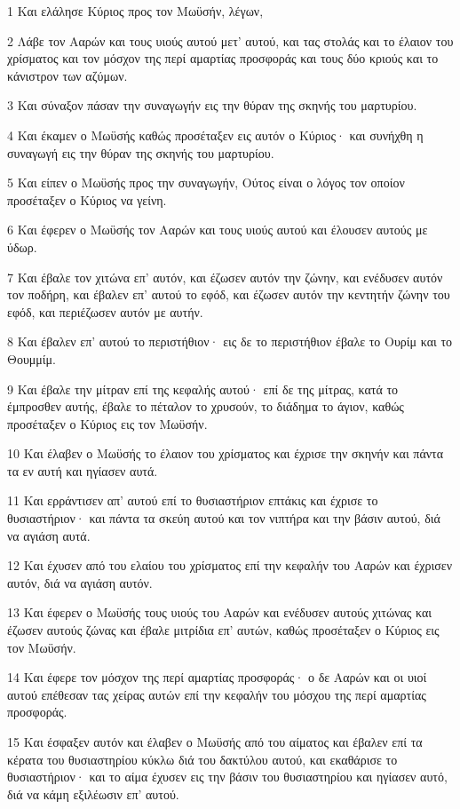 \par 1 Και ελάλησε Κύριος προς τον Μωϋσήν, λέγων,
\par 2 Λάβε τον Ααρών και τους υιούς αυτού μετ' αυτού, και τας στολάς και το έλαιον του χρίσματος και τον μόσχον της περί αμαρτίας προσφοράς και τους δύο κριούς και το κάνιστρον των αζύμων.
\par 3 Και σύναξον πάσαν την συναγωγήν εις την θύραν της σκηνής του μαρτυρίου.
\par 4 Και έκαμεν ο Μωϋσής καθώς προσέταξεν εις αυτόν ο Κύριος· και συνήχθη η συναγωγή εις την θύραν της σκηνής του μαρτυρίου.
\par 5 Και είπεν ο Μωϋσής προς την συναγωγήν, Ούτος είναι ο λόγος τον οποίον προσέταξεν ο Κύριος να γείνη.
\par 6 Και έφερεν ο Μωϋσής τον Ααρών και τους υιούς αυτού και έλουσεν αυτούς με ύδωρ.
\par 7 Και έβαλε τον χιτώνα επ' αυτόν, και έζωσεν αυτόν την ζώνην, και ενέδυσεν αυτόν τον ποδήρη, και έβαλεν επ' αυτού το εφόδ, και έζωσεν αυτόν την κεντητήν ζώνην του εφόδ, και περιέζωσεν αυτόν με αυτήν.
\par 8 Και έβαλεν επ' αυτού το περιστήθιον· εις δε το περιστήθιον έβαλε το Ουρίμ και το Θουμμίμ.
\par 9 Και έβαλε την μίτραν επί της κεφαλής αυτού· επί δε της μίτρας, κατά το έμπροσθεν αυτής, έβαλε το πέταλον το χρυσούν, το διάδημα το άγιον, καθώς προσέταξεν ο Κύριος εις τον Μωϋσήν.
\par 10 Και έλαβεν ο Μωϋσής το έλαιον του χρίσματος και έχρισε την σκηνήν και πάντα τα εν αυτή και ηγίασεν αυτά.
\par 11 Και ερράντισεν απ' αυτού επί το θυσιαστήριον επτάκις και έχρισε το θυσιαστήριον· και πάντα τα σκεύη αυτού και τον νιπτήρα και την βάσιν αυτού, διά να αγιάση αυτά.
\par 12 Και έχυσεν από του ελαίου του χρίσματος επί την κεφαλήν του Ααρών και έχρισεν αυτόν, διά να αγιάση αυτόν.
\par 13 Και έφερεν ο Μωϋσής τους υιούς του Ααρών και ενέδυσεν αυτούς χιτώνας και έζωσεν αυτούς ζώνας και έβαλε μιτρίδια επ' αυτών, καθώς προσέταξεν ο Κύριος εις τον Μωϋσήν.
\par 14 Και έφερε τον μόσχον της περί αμαρτίας προσφοράς· ο δε Ααρών και οι υιοί αυτού επέθεσαν τας χείρας αυτών επί την κεφαλήν του μόσχου της περί αμαρτίας προσφοράς.
\par 15 Και έσφαξεν αυτόν και έλαβεν ο Μωϋσής από του αίματος και έβαλεν επί τα κέρατα του θυσιαστηρίου κύκλω διά του δακτύλου αυτού, και εκαθάρισε το θυσιαστήριον· και το αίμα έχυσεν εις την βάσιν του θυσιαστηρίου και ηγίασεν αυτό, διά να κάμη εξιλέωσιν επ' αυτού.

